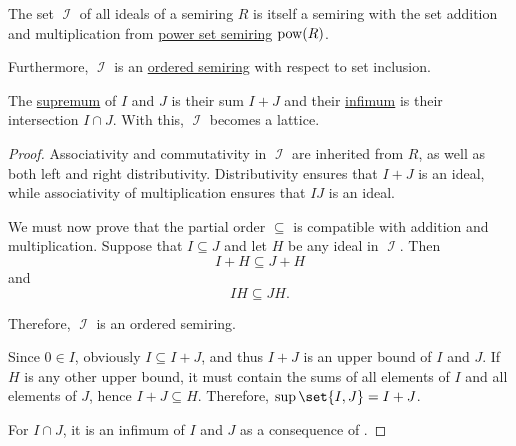 \begin{proposition}\label{thm:semiring_of_ideals}
  \hfill
  \begin{thmenum}
     The set \( \mscrI \) of all ideals of a semiring \( R \) is itself a semiring with the set addition and multiplication from \hyperref[def:semiring/power_set]{power set semiring} \( \operatorname{pow}(R) \).

     Furthermore, \( \mscrI \) is an \hyperref[def:ordered_semiring]{ordered semiring} with respect to set inclusion.

     The \hyperref[def:partially_ordered_set_extremal_points/supremum_and_infimum]{supremum} of \( I \) and \( J \) is their sum \( I + J \) and their \hyperref[def:partially_ordered_set_extremal_points/supremum_and_infimum]{infimum} is their intersection \( I \cap J \). With this, \( \mscrI \) becomes a lattice.
  \end{thmenum}
\end{proposition}
\begin{proof}
   Associativity and commutativity in \( \mscrI \) are inherited from \( R \), as well as both left and right distributivity. Distributivity ensures that \( I + J \) is an ideal, while associativity of multiplication ensures that \( IJ \) is an ideal.

   We must now prove that the partial order \( \subseteq \) is compatible with addition and multiplication. Suppose that \( I \subseteq J \) and let \( H \) be any ideal in \( \mscrI \). Then
  \begin{equation*}
    I + H \subseteq J + H
  \end{equation*}
  and
  \begin{equation*}
    IH \subseteq JH.
  \end{equation*}

  Therefore, \( \mscrI \) is an ordered semiring.

   Since \( 0 \in I \), obviously \( I \subseteq I + J \), and thus \( I + J \) is an upper bound of \( I \) and \( J \). If \( H \) is any other upper bound, it must contain the sums of all elements of \( I \) and all elements of \( J \), hence \( I + J \subseteq H \). Therefore, \( \sup\set{I, J} = I + J \).

  For \( I \cap J \), it is an infimum of \( I \) and \( J \) as a consequence of .
\end{proof}

